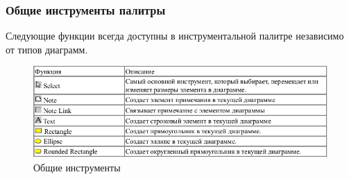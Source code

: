 \documentclass[a4paper,12pt]{extreport}
\begin{document}
\subsubsection*{Общие инструменты палитры}
Следующие функции всегда доступны в инструментальной палитре независимо от типов
диаграмм.
\begin{figure}[h!]
	\centering
	\includegraphics[width=0.9\linewidth]{images/commoninstruments}
	\caption{Общие инструменты}
	\label{fig:commoninstruments}
\end{figure}
\end{document}
